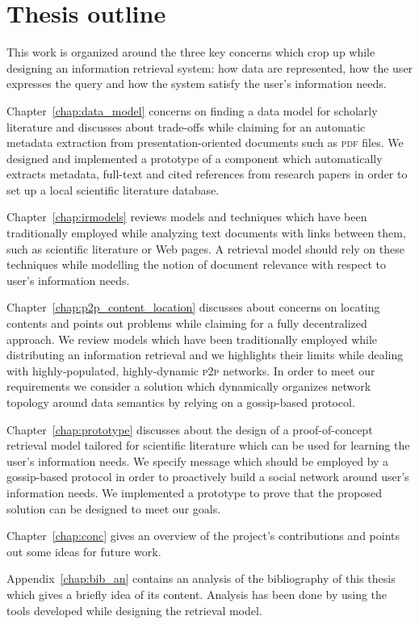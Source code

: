 \section{\label{sec:thesis_outline}Thesis outline}
This work is organized around the three key concerns which crop up while designing an information retrieval system: how data are represented, how the user expresses the query and how the system satisfy the user's information needs.

Chapter~\ref{chap:data_model} concerns on finding a data model for scholarly literature and discusses about trade-offs while claiming for an automatic metadata extraction from presentation-oriented documents such as \textsc{pdf} files. We designed and implemented a prototype of a component which automatically extracts metadata, full-text and cited references from research papers in order to set up a local scientific literature database.

Chapter~\ref{chap:irmodels} reviews models and techniques which have been traditionally employed while analyzing text documents with links between them, such as scientific literature or Web pages. A retrieval model should rely on these techniques while modelling the notion of document relevance with respect to user's information needs.

Chapter~\ref{chap:p2p_content_location} discusses about concerns on locating contents and points out problems while claiming for a fully decentralized approach. We review models which have been traditionally employed while distributing an information retrieval and we highlights their limits while dealing with highly-populated, highly-dynamic \textsc{p2p} networks. In order to meet our requirements we consider a solution which dynamically organizes network topology around data semantics by relying on a gossip-based protocol.

Chapter~\ref{chap:prototype} discusses about the design of a proof-of-concept retrieval model tailored for scientific literature which can be used for learning the user's information needs. We specify message which should be employed by a gossip-based protocol in order to proactively build a social network around user's information needs. We implemented a prototype to prove that the proposed solution can be designed to meet our goals.

Chapter~\ref{chap:conc} gives an overview of the project's contributions and points out some ideas for future work.

Appendix~\ref{chap:bib_an} contains an analysis of the bibliography of this thesis which gives a briefly idea of its content. Analysis has been done by using the tools developed while designing the retrieval model.

